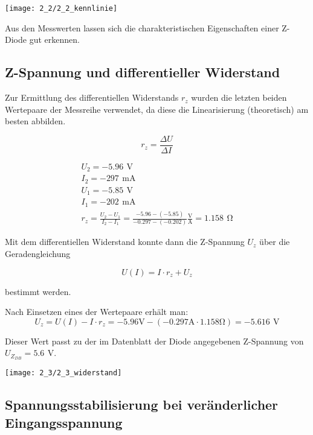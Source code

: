 \documentclass[a4paper, 12pt]{article}
\begin{document}
\begin{center}
 \texttt{[image: 2\_2/2\_2\_kennlinie]}
\end{center}

Aus den Messwerten lassen sich die charakteristischen Eigenschaften einer
Z-Diode gut erkennen.

\subsection{Z-Spannung und differentieller Widerstand}

Zur Ermittlung des differentiellen Widerstands $r_z$ wurden die letzten beiden
Wertepaare der Messreihe verwendet, da diese die Linearisierung (theoretisch) am besten
abbilden.

$$ r_z = \frac{\Delta U}{\Delta I} $$

\begin{gather*}
  U_2 = -5.96 \,\ \si{\volt}\\
  I_2 = -297 \,\ \si{\milli\ampere}\\
  U_1 = -5.85 \,\ \si{\volt}\\
  I_1 = -202 \,\ \si{\milli\ampere}\\
  r_z = \frac{U_2 - U_1}{I_2-I_1} = \frac{-5.96 - (-5.85)}{-0.297 - (-0.202)}
  \frac{\si{\volt}}{\si{\ampere}} = 1.158 \,\ \si{\ohm}
\end{gather*}

Mit dem differentiellen Widerstand konnte dann die Z-Spannung $U_z$ über die Geradengleichung

$$U(I) = I \cdot r_z + U_z$$

\noindent bestimmt werden.

\noindent Nach Einsetzen eines der Wertepaare erhält man:
$$ U_z = U(I) - I\cdot r_z = -5.96 \si{\volt} - (-0.297 \si{\ampere} \cdot 1.158
\si{\ohm}) = -5.616 \,\ \si{\volt} $$

\noindent Dieser Wert passt zu der im Datenblatt der Diode angegebenen
Z-Spannung von $U_{Z_{DB}} = 5.6 \,\ \si{\volt}$.
\begin{center}
 \texttt{[image: 2\_3/2\_3\_widerstand]}
\end{center}

\subsection{Spannungsstabilisierung bei veränderlicher Eingangsspannung}
\end{document}

